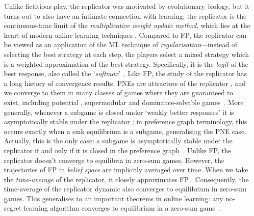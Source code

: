\documentclass[preprint,authoryear]{elsarticle}
\begin{document}

Unlike fictitious play, the replicator was motivated by evolutionary biology, but it turns out to also have an intimate connection with learning: the replicator is the continuous-time limit of the \emph{multiplicative weight update method}, which lies at the heart of modern online learning techniques \citep{arora_multiplicative_2012}. Compared to FP, the replicator can be viewed as an application of the ML technique of \emph{regularisation}---instead of selecting the best strategy at each step, the players select a mixed strategy which is a weighted approximation of the best strategy. Specifically, it is the \emph{logit} \citep{luce1959individual} of the best response, also called the `\emph{softmax}'~\citep{boyd2004convex}. Like FP, the study of the replicator has a long history of convergence results. PNEs are attractors of the replicator \citep{sandholm2010population}, and we converge to them in many classes of games where they are guaranteed to exist, including potential \citep{monderer_potential_1996}, supermodular \citep{milgrom_rationalizability_1990} and dominance-solvable games~\citep{sandholm2010population}. More generally, whenever a subgame is closed under `weakly better responses' it is asymptotically stable under the replicator \citep{gaunersdorfer_fictitious_1995}; in preference graph terminology, this occurs exactly when a sink equilibrium is a subgame, generalising the PNE case. Actually, this is the only case: a subgame is asymptotically stable under the replicator if and only if it is closed in the preference graph~\citep{biggar_replicator_2023}. Unlike FP, the replicator doesn't converge to equilibria in zero-sum games. However, the trajectories of FP in \emph{belief space} are implicitly averaged over time. When we take the \emph{time-average} of the replicator, it closely approximates FP \citep{gaunersdorfer_fictitious_1995,hofbauer_time_2009,viossat_no-regret_2013}. Consequently, the time-average of the replicator dynamic also converges to equilibrium in zero-sum games. This generalises to an important theorems in online learning: any no-regret learning algorithm converges to equilibrium in a zero-sum game~\citep{cesa2006prediction}.
\end{document}
